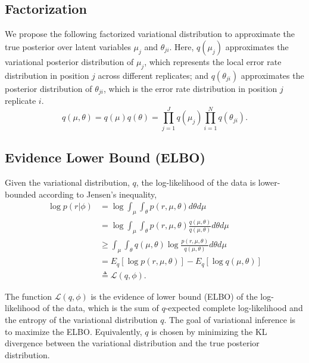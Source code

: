 \documentclass[11pt,reqno]{amsart}
\begin{document}
\subsection{Factorization}
We propose the following factorized variational distribution to approximate the true posterior over latent variables $\mu_j$ and $\theta_{ji}$.
Here, $q(\mu_j)$ approximates the variational posterior distribution of $\mu_j$, which represents the local error rate distribution in position $j$ across different replicates;
and $q(\theta_{ji})$ approximates the posterior distribution of $\theta_{ji}$, which is the error rate distribution in position $j$ replicate $i$.
\begin{equation}
  q(\mu, \theta) = q(\mu)q(\theta) = \prod_{j=1}^J q(\mu_{j}) \prod_{i=1}^N q(\theta_{ji}).
  \label{eq:vardist}
\end{equation}
\subsection{Evidence Lower Bound (ELBO)}
Given the variational distribution, $q$, the log-likelihood of the data is lower-bounded according to Jensen's inequality,
\begin{equation}
\begin{split}
\log p \left( r | \phi \right) &= \log \int_\mu \int_\theta p\left(r,\mu,\theta \right) d\theta d\mu \\
&= \log \int_\mu \int_\theta p\left(r,\mu,\theta \right)\frac{q\left(\mu,\theta \right) }{q\left(\mu,\theta \right) } d\theta d\mu \\
&\geq \int_\mu \int_\theta q\left(\mu,\theta \right) \log \frac{ p\left(r,\mu,\theta \right)}{q\left(\mu,\theta \right)} d\theta d\mu \\
&= E_q \left[ \log p\left(r,\mu,\theta \right)\right] - E_q \left[ \log q\left(\mu,\theta \right)\right] \\
&\triangleq \mathcal{L}(q, \phi).
\end{split}
\end{equation}

The function $\mathcal{L}(q, \phi)$ is the evidence of lower bound (ELBO) of the log-likelihood of the data, which is the sum of $q$-expected complete log-likelihood and the entropy of the variational distribution $q$.
The goal of variational inference is to maximize the ELBO.
Equivalently, $q$ is chosen by minimizing the KL divergence between the variational distribution and the true posterior distribution.
\end{document}
